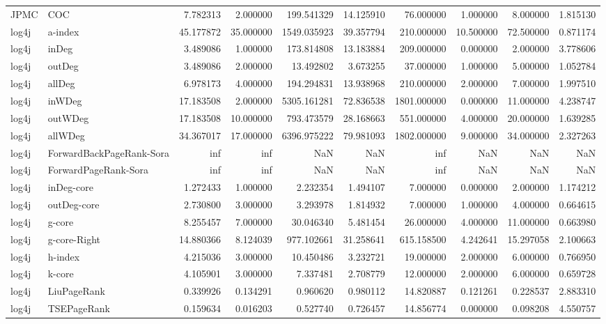 \begin{tabular}{llrrrrrrrr}
JPMC & COC & 7.782313 & 2.000000 & 199.541329 & 14.125910 & 76.000000 & 1.000000 & 8.000000 & 1.815130 \\
log4j & a-index & 45.177872 & 35.000000 & 1549.035923 & 39.357794 & 210.000000 & 10.500000 & 72.500000 & 0.871174 \\
log4j & inDeg & 3.489086 & 1.000000 & 173.814808 & 13.183884 & 209.000000 & 0.000000 & 2.000000 & 3.778606 \\
log4j & outDeg & 3.489086 & 2.000000 & 13.492802 & 3.673255 & 37.000000 & 1.000000 & 5.000000 & 1.052784 \\
log4j & allDeg & 6.978173 & 4.000000 & 194.294831 & 13.938968 & 210.000000 & 2.000000 & 7.000000 & 1.997510 \\
log4j & inWDeg & 17.183508 & 2.000000 & 5305.161281 & 72.836538 & 1801.000000 & 0.000000 & 11.000000 & 4.238747 \\
log4j & outWDeg & 17.183508 & 10.000000 & 793.473579 & 28.168663 & 551.000000 & 4.000000 & 20.000000 & 1.639285 \\
log4j & allWDeg & 34.367017 & 17.000000 & 6396.975222 & 79.981093 & 1802.000000 & 9.000000 & 34.000000 & 2.327263 \\
log4j & ForwardBackPageRank-Sora & inf & inf & NaN & NaN & inf & NaN & NaN & NaN \\
log4j & ForwardPageRank-Sora & inf & inf & NaN & NaN & inf & NaN & NaN & NaN \\
log4j & inDeg-core & 1.272433 & 1.000000 & 2.232354 & 1.494107 & 7.000000 & 0.000000 & 2.000000 & 1.174212 \\
log4j & outDeg-core & 2.730800 & 3.000000 & 3.293978 & 1.814932 & 7.000000 & 1.000000 & 4.000000 & 0.664615 \\
log4j & g-core & 8.255457 & 7.000000 & 30.046340 & 5.481454 & 26.000000 & 4.000000 & 11.000000 & 0.663980 \\
log4j & g-core-Right & 14.880366 & 8.124039 & 977.102661 & 31.258641 & 615.158500 & 4.242641 & 15.297058 & 2.100663 \\
log4j & h-index & 4.215036 & 3.000000 & 10.450486 & 3.232721 & 19.000000 & 2.000000 & 6.000000 & 0.766950 \\
log4j & k-core & 4.105901 & 3.000000 & 7.337481 & 2.708779 & 12.000000 & 2.000000 & 6.000000 & 0.659728 \\
log4j & LiuPageRank & 0.339926 & 0.134291 & 0.960620 & 0.980112 & 14.820887 & 0.121261 & 0.228537 & 2.883310 \\
log4j & TSEPageRank & 0.159634 & 0.016203 & 0.527740 & 0.726457 & 14.856774 & 0.000000 & 0.098208 & 4.550757 \\

\end{tabular}

